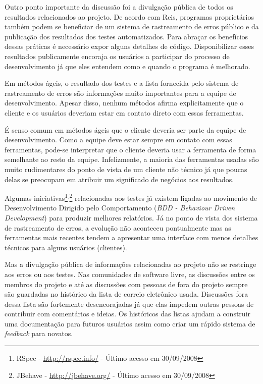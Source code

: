 Outro ponto importante da discussão foi a divulgação pública de todos
os resultados relacionados ao projeto. De acordo com Reis, programas
proprietários também podem se beneficiar de um sistema de rastreamento
de erros público e da publicação dos resultados dos testes
automatizados. Para abraçar os benefícios dessas práticas é necessário
expor alguns detalhes de código. Disponibilizar esses resultados
publicamente encoraja os usuários a participar do processo de
desenvolvimento já que eles entendem como e quando o programa é
melhorado.

Em métodos ágeis, o resultado dos testes e a lista fornecida pelo
sistema de rastreamento de erros são informações muito importantes
para a equipe de desenvolvimento. Apesar disso, nenhum métodos afirma
explicitamente que o cliente e os usuários deveriam estar em contato
direto com essas ferramentas.

É senso comum em métodos ágeis que o cliente deveria ser parte da
equipe de desenvolvimento. Como a equipe deve estar sempre em contato
com essas ferramentas, pode-se interpretar que o cliente deveria usar
a ferramenta de forma semelhante ao resto da equipe. Infelizmente, a
maioria das ferramentas usadas são muito rudimentares do ponto de
vista de um cliente não técnico já que poucas delas se preocupam em
atribuir um significado de negócios aos resultados.

Algumas iniciativas\footnote{RSpec - \url{http://rspec.info/} - Último
  acesso em 30/09/2008}$^{, }$\footnote{JBehave -
  \url{http://jbehave.org/} - Último acesso em 30/09/2008}
relacionadas aos testes já existem ligadas ao movimento de
Desenvolvimento Dirigido pelo Comportamento (\emph{BDD - Behaviour
  Driven Development}) \cite{North2006} para produzir melhores
relatórios. Já no ponto de vista dos sistema de rastreamento de erros,
a evolução não aconteceu pontualmente mas as ferramentas mais recentes
tendem a apresentar uma interface com menos detalhes técnicos para
alguns usuários (clientes).

Mas a divulgação pública de informações relacionadas ao projeto não se
restringe aos erros ou aos testes. Nas comunidades de software livre,
as discussões entre os membros do projeto e até as discussões com
pessoas de fora do projeto sempre são guardadas no histórico da lista
de correio eletrônico usada. Discussões fora dessa lista são
fortemente desencorajadas já que elas impedem outras pessoas de
contribuir com comentários e ideias. Os históricos das listas ajudam a
construir uma documentação para futuros usuários assim como criar um
rápido sistema de \emph{feedback} para novatos.

